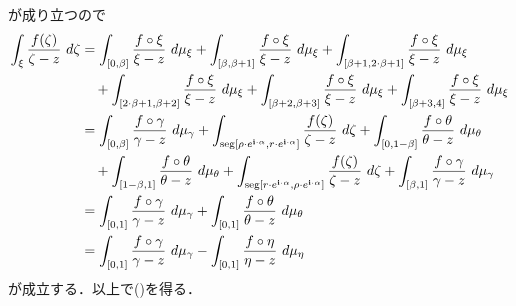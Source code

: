 	が成り立つので
	\begin{align}
		\int_{\xi} \frac{f(\zeta)}{\zeta - z}\ d\zeta
		&= \int_{[0,\beta]} \frac{f \circ \xi}{\xi - z}\ d\mu_{\xi} 
			+ \int_{[\beta,\beta+1]} \frac{f \circ \xi}{\xi - z}\ d\mu_{\xi}
			+ \int_{[\beta+1,2\cdot\beta+1]} \frac{f \circ \xi}{\xi - z}\ d\mu_{\xi} \\
			&\quad + \int_{[2\cdot\beta+1,\beta+2]} \frac{f \circ \xi}{\xi - z}\ d\mu_{\xi}
			+ \int_{[\beta+2,\beta+3]} \frac{f \circ \xi}{\xi - z}\ d\mu_{\xi}
			+ \int_{[\beta+3,4]} \frac{f \circ \xi}{\xi - z}\ d\mu_{\xi} \\
		&= \int_{[0,\beta]} \frac{f \circ \gamma}{\gamma - z}\ d\mu_{\gamma} 
			+ \int_{\seg{\rho \cdot e^{\isym \cdot \alpha}}{r \cdot e^{\isym \cdot \alpha}}} \frac{f(\zeta)}{\zeta - z}\ d\zeta
			+ \int_{[0,1-\beta]} \frac{f \circ \theta}{\theta - z}\ d\mu_{\theta} \\
			&\quad + \int_{[1-\beta,1]} \frac{f \circ \theta}{\theta - z}\ d\mu_{\theta}
			+ \int_{\seg{r \cdot e^{\isym \cdot \alpha}}{\rho \cdot e^{\isym \cdot \alpha}}} \frac{f(\zeta)}{\zeta - z}\ d\zeta
			+ \int_{[\beta,1]} \frac{f \circ \gamma}{\gamma - z}\ d\mu_{\gamma} \\
		&= \int_{[0,1]} \frac{f \circ \gamma}{\gamma - z}\ d\mu_{\gamma} + \int_{[0,1]} \frac{f \circ \theta}{\theta - z}\ d\mu_{\theta} \\
		&= \int_{[0,1]} \frac{f \circ \gamma}{\gamma - z}\ d\mu_{\gamma} - \int_{[0,1]} \frac{f \circ \eta}{\eta - z}\ d\mu_{\eta}
	\end{align}
	が成立する．以上で()を得る．
	
